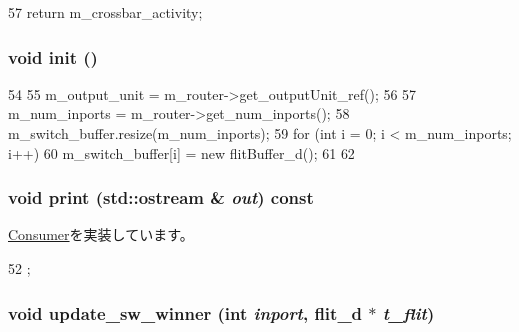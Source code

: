 \begin{DoxyCode}
57 { return m_crossbar_activity; }
\end{DoxyCode}
\hypertarget{classSwitch__d_a02fd73d861ef2e4aabb38c0c9ff82947}{
\subsubsection[{init}]{\setlength{\rightskip}{0pt plus 5cm}void init ()}}
\label{classSwitch__d_a02fd73d861ef2e4aabb38c0c9ff82947}



\begin{DoxyCode}
54 {
55     m_output_unit = m_router->get_outputUnit_ref();
56 
57     m_num_inports = m_router->get_num_inports();
58     m_switch_buffer.resize(m_num_inports);
59     for (int i = 0; i < m_num_inports; i++) {
60         m_switch_buffer[i] = new flitBuffer_d();
61     }
62 }
\end{DoxyCode}
\hypertarget{classSwitch__d_ac55fe386a101fbae38c716067c9966a0}{
\subsubsection[{print}]{\setlength{\rightskip}{0pt plus 5cm}void print (std::ostream \& {\em out}) const}}
\label{classSwitch__d_ac55fe386a101fbae38c716067c9966a0}


\hyperlink{classConsumer_a3ea5f7af5db62cc24f4e40df9ea5c971}{Consumer}を実装しています。


\begin{DoxyCode}
52 {};
\end{DoxyCode}
\hypertarget{classSwitch__d_ad498c35c5be2d1b524846119d5e2b254}{
\subsubsection[{update\_\-sw\_\-winner}]{\setlength{\rightskip}{0pt plus 5cm}void update\_\-sw\_\-winner (int {\em inport}, \/  {\bf flit\_\-d} $\ast$ {\em t\_\-flit})}}
\label{classSwitch__d_ad498c35c5be2d1b524846119d5e2b254}



